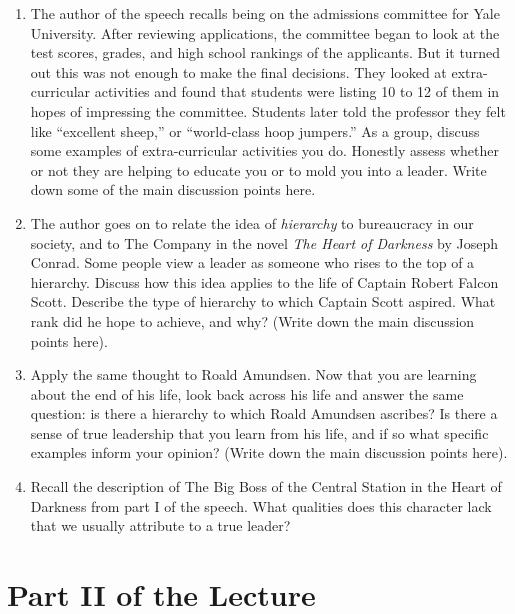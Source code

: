 \documentclass{article}
\begin{document}
\begin{enumerate}
\item The author of the speech recalls being on the admissions committee for Yale University.  After reviewing applications, the committee began to look at the test scores, grades, and high school rankings of the applicants.  But it turned out this was not enough to make the final decisions.  They looked at extra-curricular activities and found that students were listing 10 to 12 of them in hopes of impressing the committee.  Students later told the professor they felt like ``excellent sheep,'' or ``world-class hoop jumpers.''  As a group, discuss some examples of extra-curricular activities you do.  Honestly assess whether or not they are helping to educate you or to mold you into a leader. Write down some of the main discussion points here.  \\ \vspace{3cm}
\item The author goes on to relate the idea of \textit{hierarchy} to bureaucracy in our society, and to The Company in the novel \textit{The Heart of Darkness} by Joseph Conrad.  Some people view a leader as someone who rises to the top of a hierarchy.  Discuss how this idea applies to the life of Captain Robert Falcon Scott.  Describe the type of hierarchy to which Captain Scott aspired.  What rank did he hope to achieve, and why?  (Write down the main discussion points here).  \\ \vspace{3cm}
\item Apply the same thought to Roald Amundsen.  Now that you are learning about the end of his life, look back across his life and answer the same question: is there a hierarchy to which Roald Amundsen ascribes?  Is there a sense of true leadership that you learn from his life, and if so what specific examples inform your opinion?  (Write down the main discussion points here). \\ \vspace{3cm}
\item Recall the description of The Big Boss of the Central Station in the Heart of Darkness from part I of the speech.  What qualities does this character lack that we usually attribute to a true leader? \\ \vspace{2cm}
\end{enumerate}

\section{Part II of the Lecture}
\end{document}
